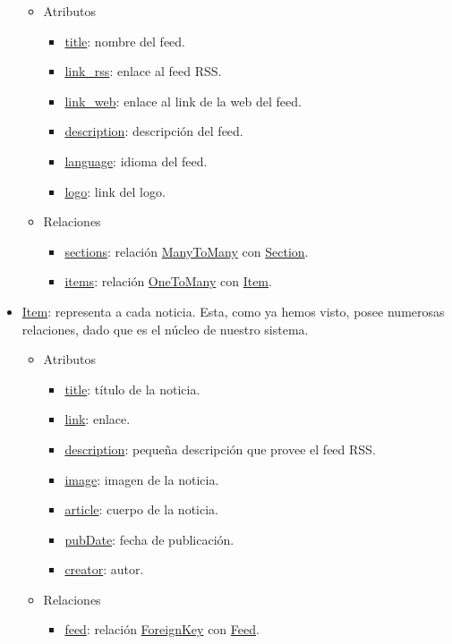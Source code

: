 \begin{itemize}
\begin{itemize}
        \item Atributos
        \begin{itemize}
            \item \underline{title}: nombre del feed.
            \item \underline{link\_rss}: enlace al feed RSS.
            \item \underline{link\_web}: enlace al link de la web del feed.
            \item \underline{description}: descripción del feed.
            \item \underline{language}: idioma del feed.
            \item \underline{logo}: link del logo.
        \end{itemize}
        \item Relaciones
        \begin{itemize}
            \item \underline{sections}: relación \underline{ManyToMany} con \underline{Section}.
            \item \underline{items}: relación \underline{OneToMany} con \underline{Item}.
        \end{itemize}
    \end{itemize}
    \item \underline{Item}: representa a cada noticia. Esta, como ya hemos visto, posee numerosas relaciones, dado que es el núcleo de nuestro sistema.
    \begin{itemize}
        \item Atributos
        \begin{itemize}
            \item \underline{title}: título de la noticia.
            \item \underline{link}: enlace.
            \item \underline{description}: pequeña descripción que provee el feed RSS.
            \item \underline{image}: imagen de la noticia.
            \item \underline{article}: cuerpo de la noticia.
            \item \underline{pubDate}: fecha de publicación.
            \item \underline{creator}: autor.
        \end{itemize}
        \item Relaciones
        \begin{itemize}
            \item \underline{feed}: relación \underline{ForeignKey} con \underline{Feed}.

\end{itemize}
\end{itemize}
\end{itemize}
